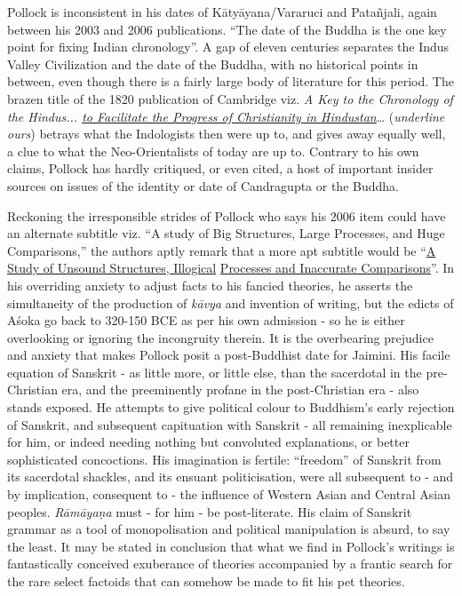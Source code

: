 Pollock is inconsistent in his dates of Kātyāyana/Vararuci and Patañjali, again between his 2003 and 2006 publications. “The date of the Buddha is the one key point for fixing Indian chronology”. A gap of eleven centuries separates the Indus Valley Civilization and the date of the Buddha, with no historical points in between, even though there is a fairly large body of literature for this period. The brazen title of the 1820 publication of Cambridge viz. \textit{A Key to the Chronology of the Hindus... \underline{to Facilitate the Progress of Christianity in Hindustan}}… (\textit{underline ours}) betrays what the Indologists then were up to, and gives away equally well, a clue to what the Neo-Orientalists of today are up to. Contrary to his own claims, Pollock has hardly critiqued, or even cited, a host of important insider sources on issues of the identity or date of Candragupta or the Buddha.

Reckoning the irresponsible strides of Pollock who says his 2006 item could have an alternate subtitle viz. “A study of Big Structures, Large Processes, and Huge Comparisons,” the authors aptly remark that a more apt subtitle would be “\underline{A Study of Unsound Structures, Illogical} \underline{Processes and Inaccurate Comparisons}”. In his overriding anxiety to adjust facts to his fancied theories, he asserts the simultaneity of the production of \textit{kāvya} and invention of writing, but the edicts of Aśoka go back to 320-150 BCE as per his own admission - so he is either overlooking or ignoring the incongruity therein. It is the overbearing prejudice and anxiety that makes Pollock posit a post-Buddhist date for Jaimini. His facile equation of Sanskrit - as little more, or little else, than the sacerdotal in the pre-Christian era, and the preeminently profane in the post-Christian era - also stands exposed. He attempts to give political colour to Buddhism’s early rejection of Sanskrit, and subsequent capituation with Sanskrit - all remaining inexplicable for him, or indeed needing nothing but convoluted explanations, or better sophisticated concoctions. His imagination is fertile: “freedom” of Sanskrit from its sacerdotal shackles, and its ensuant politicisation, were all subsequent to - and by implication, consequent to - the influence of Western Asian and Central Asian peoples. \textit{Rāmāyaṇa} must - for him - be post-literate. His claim of Sanskrit grammar as a tool of monopolisation and political manipulation is absurd, to say the least. It may be stated in conclusion that what we find in Pollock’s writings is fantastically conceived exuberance of theories accompanied by a frantic search for the rare select factoids that can somehow be made to fit his pet theories.

